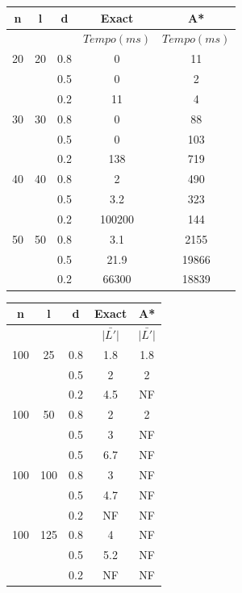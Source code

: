 \documentclass[12pt]{article}
\begin{document}
		\vspace{2cm}

		\begin{tabular}{c|c|c|c|c} \hline
			n & l & d & Exact & A* \\ \hline
			& & & $Tempo(ms)$ & $Tempo(ms)$\\ \hline
			20 & 20 & 0.8 &  0 & 11\\
			   &    & 0.5 &  0 & 2\\
			   &    & 0.2 & 11 & 4\\ \hline
			30 & 30 & 0.8 &  0 & 88 \\
			   &    & 0.5 &  0 & 103\\
			   &    & 0.2 & 138 & 719\\ \hline
			40 & 40 & 0.8 &  2 & 490\\
			   &    & 0.5 & 3.2 & 323\\
			   &    & 0.2 & 100200 & 144\\ \hline
			50 & 50 & 0.8 & 3.1 & 2155\\
			   &    & 0.5 & 21.9 & 19866\\
			   &    & 0.2 & 66300 & 18839\\ \hline
		\end{tabular}
		
		\vspace{2cm}

		\begin{tabular}{c|c|c|c|c} \hline
			n & l & d & Exact & A* \\ \hline
			& & & $\bar{|L'|}$ & $\bar{|L'|}$ \\ \hline
			100 & 25  & 0.8 & 1.8 & 1.8\\
			   &      & 0.5 &  2 & 2\\
			   &      & 0.2 & 4.5 & NF\\ \hline
			100 & 50  & 0.8 &  2 & 2 \\
			   &      & 0.5 &  3 & NF\\
			   &      & 0.5 & 6.7 & NF\\ \hline
			100 & 100 & 0.8 &  3 & NF\\
			   &      & 0.5 & 4.7 & NF\\
			   &      & 0.2 & NF & NF\\ \hline
			100 & 125 & 0.8 & 4 & NF\\
			   &      & 0.5 & 5.2 & NF\\
			   &      & 0.2 & NF & NF\\ \hline
		\end{tabular}
\end{document}
